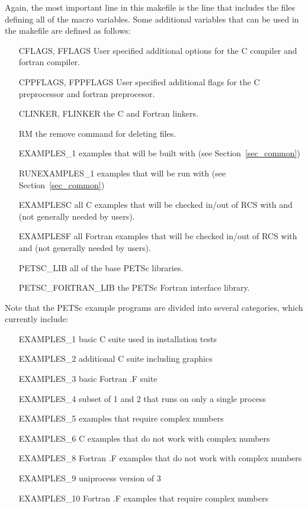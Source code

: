 {{{Again, the most important line in this makefile is the 
line that includes the files defining all of the macro variables.
Some additional variables that can be used in the makefile are defined
as follows:
\begin{itemize}
\item[CFLAGS, FFLAGS] User specified additional options for the C compiler and
        fortran compiler.
\item[CPPFLAGS, FPPFLAGS] User specified additional flags for the C preprocessor
        and fortran preprocesor.
\item[CLINKER, FLINKER] the C and Fortran linkers. 
\item[RM] the remove command for deleting files.
\item[EXAMPLES\_1] examples that will be built with
              (see Section~\ref{sec_common})
\item[RUNEXAMPLES\_1] examples that will be run with
               (see Section~\ref{sec_common})
\item[EXAMPLESC] all C examples that will be checked in/out of RCS
             with   and   (not generally
             needed by users).
\item[EXAMPLESF] all Fortran examples that will be checked in/out of
             RCS with   and   (not generally
             needed by users).
\item[PETSC\_LIB] all of the base PETSc libraries.
\item[PETSC\_FORTRAN\_LIB] the PETSc Fortran interface 
             library. 
\end{itemize}
Note that the PETSc example programs are divided into several
categories, which currently include: 
\begin{itemize}
\item[EXAMPLES\_1] basic C suite used in installation tests\\
\item[EXAMPLES\_2] additional C suite including graphics\\
\item[EXAMPLES\_3] basic Fortran .F suite\\
\item[EXAMPLES\_4] subset of 1 and 2 that runs on only a single process\\
\item[EXAMPLES\_5] examples that require complex numbers\\
\item[EXAMPLES\_6] C examples that do not work with complex numbers\\
\item[EXAMPLES\_8] Fortran .F examples that do not work with complex numbers\\
\item[EXAMPLES\_9] uniprocess version of 3\\
\item[EXAMPLES\_10] Fortran .F examples that require complex numbers\\
\end{itemize}

}}}
